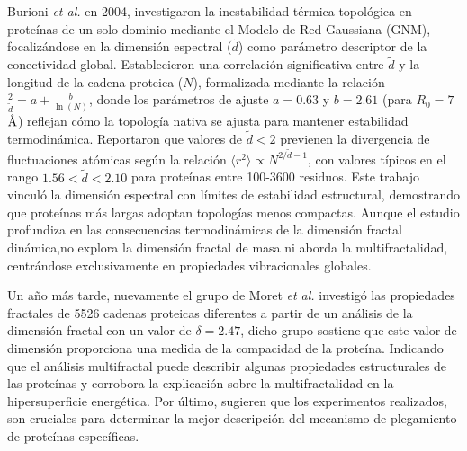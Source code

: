 Burioni \textit{et al.} en 2004, \cite{Burioni2004} investigaron la inestabilidad térmica topológica en proteínas de un solo dominio mediante el Modelo de Red Gaussiana (GNM), focalizándose en la dimensión espectral ($\tilde{d}$) como parámetro descriptor de la conectividad global. Establecieron una correlación significativa entre $\tilde{d}$ y la longitud de la cadena proteica ($N$), formalizada mediante la relación $\frac{2}{\tilde{d}} = a + \frac{b}{\ln(N)}$, donde los parámetros de ajuste $a = 0.63$ y $b = 2.61$ (para $R_0 = 7$ $\textup{\r{A}}$) reflejan cómo la topología nativa se ajusta para mantener estabilidad termodinámica. Reportaron que valores de $\tilde{d} < 2$ previenen la divergencia de fluctuaciones atómicas según la relación $\langle r^2 \rangle \propto N^{2/\tilde{d}-1}$, con valores típicos en el rango $1.56 < \tilde{d} < 2.10$ para proteínas entre 100-3600 residuos. Este trabajo vinculó la dimensión espectral con límites de estabilidad estructural, demostrando que proteínas más largas adoptan topologías menos compactas. Aunque el estudio profundiza en las consecuencias termodinámicas de la dimensión fractal dinámica,no explora la dimensión fractal de masa ni aborda la multifractalidad, centrándose exclusivamente en propiedades vibracionales globales.

Un año m\'{a}s tarde, nuevamente el grupo de Moret \textit{et al.} \cite{Moret2005} investig\'{o} las propiedades fractales de 5526 cadenas proteicas diferentes a partir de un an\'{a}lisis de la dimensi\'{o}n fractal con un valor de $\delta = 2.47$, dicho grupo sostiene que este valor de dimensi\'{o}n proporciona una medida de la compacidad de la prote\'{i}na. Indicando que el an\'{a}lisis multifractal puede describir algunas propiedades estructurales de las prote\'{i}nas y corrobora la explicaci\'{o}n sobre la multifractalidad en la hipersuperficie energ\'{e}tica. Por \'{u}ltimo, sugieren que los experimentos realizados, son cruciales para determinar la mejor descripci\'{o}n del mecanismo de plegamiento de prote\'{i}nas espec\'{i}ficas.


